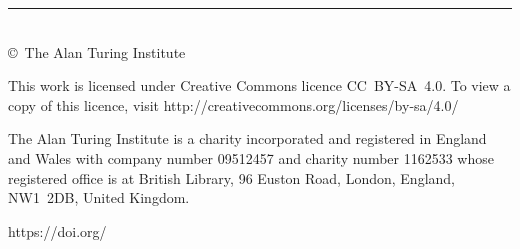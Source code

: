 \documentclass[a4paper]{article}
\begin{document}
\begin{titlepage}
\raggedright\setlength{\parindent}{0pt}%
\vspace*{5\turingcolht}

\small\raggedright%
\fontsize{8}{11}\selectfont
{\offinterlineskip\rule{9\turingcolwd}{0.15ex}\\[0.5ex]
\copyright\ The Alan Turing Institute \reportCopyrightDate\par}
\medskip 

\reportAcknowledgment\relax%

This work is licensed under Creative Commons licence CC~BY-SA~4.0. To
view a copy of this licence, visit
http://creativecommons.org/licenses/by-sa/4.0/ \medskip

The Alan Turing Institute is a charity incorporated and registered in
England and Wales with company number 09512457 and charity number
1162533 whose registered office is at British Library, 96 Euston Road,
London, England, NW1~2DB, United Kingdom.
\medskip

https://doi.org/\reportDOI
\end{titlepage}
\end{document}
